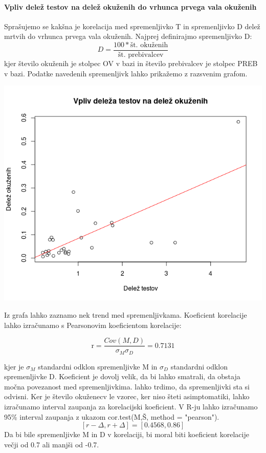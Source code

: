\documentclass[a4paper,11pt]{article}
\begin{document}
\paragraph{Vpliv delež testov na delež okuženih do vrhunca prvega vala okuženih}
Sprašujemo se kakšna je korelacija med spremenljivko T in spremenljivko D delež mrtvih do vrhunca prvega vala okuženih. Najprej definirajmo spremenljivko D:
\[D = \frac{100 * \text{št. okuženih}}{\text{št. prebivalcev}}\]
kjer število okuženih je stolpec OV v bazi in število prebivalcev je stolpec PREB v bazi. Podatke navedenih spremenljivk lahko prikažemo z razsvenim grafom.
\\
\begin{center}
\includegraphics[scale=0.6]{vpliv_deleza_testov_na_delez_okuzenih}\\
\end{center}
Iz grafa lahko zaznamo nek trend med spremenljivkama. Koeficient korelacije lahko izračunamo s Pearsonovim koeficientom korelacije:

\begin{center}
\[\text{r} = \frac{Cov(M,D)}{\sigma_{M} \sigma_{D}} = 0.7131\]
\end{center} 
kjer je \(\sigma_{M}\) standardni odklon spremenljivke M in \(\sigma_{D}\) standardni odklon spremenljivke D. Koeficient je dovolj velik, da bi lahko smatrali, da obstaja močna povezanost med spremenljivkima. lahko trdimo, da spremenljivki sta si odvisni.
Ker je število okuženecv le vzorec, ker niso šteti asimptomatiki, lahko izračunamo interval zaupanja za korelacijski koeficient. V R-ju lahko izračunamo 95\% interval zaupanja z ukazom cor.test(M,Š, method = "pearson").
\[[r - \Delta, r + \Delta] = [0.4568, 0.86]\]
Da bi bile spremenljivke M in D v korelaciji, bi moral biti koeficient korelacije večji od 0.7 ali manjši od -0.7.
\end{document}
